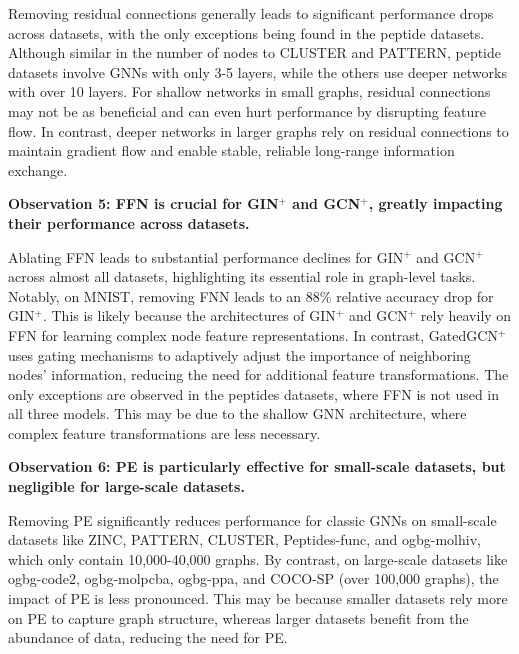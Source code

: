 Removing residual connections generally leads to significant performance drops across datasets, with the only exceptions being found in the peptide datasets. Although similar in the number of nodes to CLUSTER and PATTERN, peptide datasets involve GNNs with only 3-5 layers, while the others use deeper networks with over 10 layers. For shallow networks in small graphs, residual connections may not be as beneficial and can even hurt performance by disrupting feature flow. In contrast, deeper networks in larger graphs rely on residual connections to maintain gradient flow and enable stable, reliable long-range information exchange.

\textbf{Observation 5: FFN is crucial for GIN$^+$ and GCN$^+$, greatly impacting their performance across datasets.}

Ablating FFN leads to substantial performance declines for GIN$^+$ and GCN$^+$ across almost all datasets, highlighting its essential role in graph-level tasks. Notably, on MNIST, removing FNN leads to an 88\% relative accuracy drop for GIN$^+$. This is likely because the architectures of GIN$^+$ and GCN$^+$ rely heavily on FFN for learning complex node feature representations. In contrast, GatedGCN$^+$ uses gating mechanisms to adaptively adjust the importance of neighboring nodes’ information, reducing the need for additional feature transformations. 
The only exceptions are observed in the peptides datasets, where FFN is not used in all three models.
This may be due to the shallow GNN architecture, where complex feature transformations are less necessary.

\textbf{Observation 6: PE is particularly effective for small-scale datasets, but negligible for large-scale datasets.} 

Removing PE significantly reduces performance for classic GNNs on small-scale datasets like ZINC, PATTERN, CLUSTER, Peptides-func, and ogbg-molhiv, which only contain 10,000-40,000 graphs. By contrast, on large-scale datasets like ogbg-code2, ogbg-molpcba, ogbg-ppa, and COCO-SP (over 100,000 graphs), the impact of PE is less pronounced. This may be because smaller datasets rely more on PE to capture graph structure, whereas larger datasets benefit from the abundance of data, reducing the need for PE.


